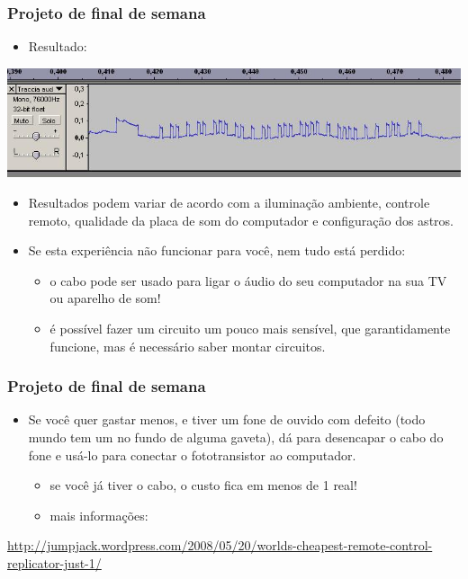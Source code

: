 \documentclass{beamer}
\begin{document}
\begin{frame}
\frametitle{Projeto de final de semana}

\begin{itemize}
\item Resultado:
\end{itemize}
\includegraphics[width=\textwidth]{images/remote-dvd-lg-rh255-PLAY-wav-76000Hz}

\begin{itemize}
\item Resultados podem variar de acordo com a iluminação
ambiente, controle remoto, qualidade da placa de som do computador e
configuração dos astros.
\item Se esta experiência não funcionar para você, nem tudo está perdido:
\begin{itemize}
\item o cabo pode ser usado para ligar o áudio do seu computador na sua
TV ou aparelho de som!
\item é possível fazer um circuito um pouco mais sensível, que garantidamente
funcione, mas é necessário saber montar circuitos.
\end{itemize}
\end{itemize}

\end{frame}


\begin{frame}
\frametitle{Projeto de final de semana}

\begin{itemize}
\item Se você quer gastar menos, e tiver um fone de ouvido com defeito
(todo mundo tem um no fundo de alguma gaveta), dá para desencapar o
cabo do fone e usá-lo para conectar o fototransistor ao computador.
\begin{itemize}
\item se você já tiver o cabo, o custo fica em menos de 1 real!
\item mais informações:
\end{itemize}
\end{itemize}
{\small
\url{http://jumpjack.wordpress.com/2008/05/20/worlds-cheapest-remote-control-replicator-just-1/}}
\end{frame}
\end{document}
